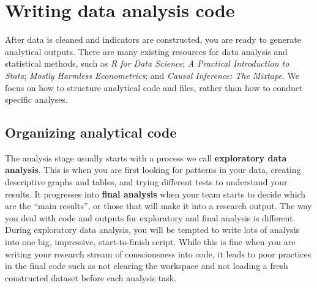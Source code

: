 
\section{Writing data analysis code}

After data is cleaned and indicators are constructed, you are ready to generate analytical outputs.
There are many existing resources for data analysis and statistical methods, such as
\textit{R for Data Science};\cite{hadley2017R}
\textit{A Practical Introduction to Stata};\cite{RePEc:gdm:wpaper:9412}
\textit{Mostly Harmless Econometrics};\cite{angrist2008mostly}
and \textit{Causal Inference: The Mixtape}.
We focus on how to structure analytical code and files, rather than how to conduct specific analyses.

\subsection{Organizing analytical code}

The analysis stage usually starts with a process we call \textbf{exploratory data analysis}.
This is when you are first looking for patterns in your data,
creating descriptive graphs and tables,
and trying different tests to understand your results.
It progresses into \textbf{final analysis} when your team starts to decide which are the ``main results'', or
those that will make it into a research output.
The way you deal with code and outputs for exploratory and final analysis is different.
During exploratory data analysis,
you will be tempted to write lots of analysis into one big, impressive, start-to-finish script.
While this is fine when you are writing your research stream of consciousness into code,
it leads to poor practices in the final code such as not clearing the workspace
and not loading a fresh constructed dataset before each analysis task.

